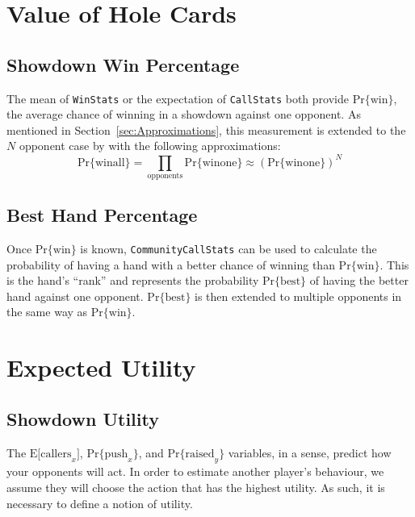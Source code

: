 \section{Value of Hole Cards}



\subsection{Showdown Win Percentage}
\label{sec:Mean}
The mean of \texttt{WinStats} or the expectation of \texttt{CallStats} both provide $\mathrm{Pr\{win\}}$, the average chance of winning in a showdown against one opponent.
As mentioned in Section~\ref{sec:Approximations}, this measurement is extended to the $N$ opponent case by with the following approximations:
\[
\mathrm{Pr\{win all\}} = \prod_{\mathrm{opponents}} \mathrm{Pr\{win one\}} \approx \left( \mathrm{Pr\{win one\}} \right)^N
\]


\subsection{Best Hand Percentage}
\label{sec:Rank}
Once $\mathrm{Pr\{win\}}$ is known, \texttt{CommunityCallStats} can be used to calculate the probability of having a hand with a better chance of winning than $\mathrm{Pr\{win\}}$.
This is the hand's ``rank'' and represents the probability $\mathrm{Pr\{best\}}$ of having the better hand against one opponent.
$\mathrm{Pr\{best\}}$ is then extended to multiple opponents in the same way as $\mathrm{Pr\{win\}}$.


\section{Expected Utility}


\subsection{Showdown Utility}
\label{sec:Utility}
The $\mathrm{E[callers}_x]$, $\mathrm{Pr\{push}_x\}$, and $\mathrm{Pr\{raised}_y\}$ variables, in a sense, predict how your opponents will act.
In order to estimate another player's behaviour, we assume they will choose the action that has the highest utility.
As such, it is necessary to define a notion of utility.

